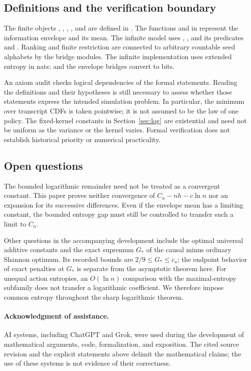 \documentclass[11pt,a4paper]{article}
\theoremstyle{definition}\newtheorem{definition}[theorem]{Definition}
\theoremstyle{remark}\newtheorem{remark}[theorem]{Remark}
\numberwithin{equation}{section}
\begin{document}
\subsection{Definitions and the verification boundary}
The finite objects , , ,
, and  are defined in .
The functions  and  in 
represent the information envelope and its mean. The infinite model uses
, , and its predicates
 and . Ranking and finite restriction are
connected to arbitrary countable seed alphabets by the bridge modules.
The infinite implementation uses extended entropy in nats;
 and the envelope bridges convert to bits.

An axiom audit checks logical dependencies of the formal statements.
Reading the definitions and their hypotheses is still necessary to assess
whether those statements express the intended simulation problem. In
particular, the minimum over transcript CDFs is taken pointwise; it is
not assumed to be the law of one policy. The fixed-kernel constants in
Section~\ref{sec:log} are existential and need not be uniform as the
variance or the kernel varies. Formal verification does not establish
historical priority or numerical practicality.

\subsection{Open questions}
The bounded logarithmic remainder need not be treated as a convergent
constant. This paper proves neither convergence of $C_n-nh-c\ln n$ nor
an expansion for its successive differences. Even if the envelope mean
has a limiting constant, the bounded entropy gap must still be controlled
to transfer such a limit to $C_n$.

Other questions in the accompanying development include the optimal
universal additive constants and the exact supremum $G_*$ of the causal
minus ordinary Shannon optimum. Its recorded bounds are
$2/9\le G_*\le c_\star$; the endpoint behavior of exact penalties at
$G_*$ is separate from the asymptotic theorem here. For unequal action
entropies, an $O(\ln n)$ comparison with the maximal-entropy subfamily
does not transfer a logarithmic coefficient. We therefore impose common
entropy throughout the sharp logarithmic theorem.

\paragraph{Acknowledgment of assistance.}
AI systems, including ChatGPT and Grok, were used during the development
of mathematical arguments, code, formalization, and exposition. The cited
source revision and the explicit statements above delimit the mathematical
claims; the use of these systems is not evidence of their correctness.
\end{document}
